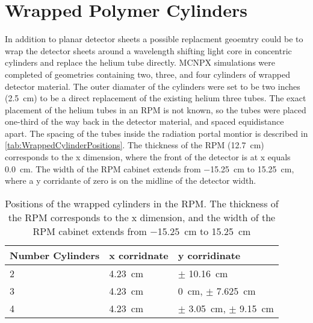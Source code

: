 \section{Wrapped Polymer Cylinders}
\label{sec:WrappedCylinders}

In addition to planar detector sheets a possible replacment geoemtry could be to wrap the detector sheets around a wavelength shifting light core in concentric cylinders and replace the helium tube directly.
MCNPX simulations were completed of geometries containing two, three, and four cylinders of wrapped detector material.
The outer diamater of the cylinders were set to be two inches (\SI{2.5}{\cm}) to be a direct replacement of the existing helium three tubes.
The exact placement of the helium tubes in an RPM is not known, so the tubes were placed one-third of the way back in the detector material, and spaced equidistance apart.
The spacing of the tubes inside the radiation portal montior is described in \autoref{tab:WrappedCylinderPositions}.
The thickness of the RPM (\SI{12.7}{\cm}) corresponds to the x dimension, where the front of the detector is at x equals \SI{0.0}{\cm}.
The width of the RPM cabinet extends from \SI{-15.25}{\cm} to \SI{15.25}{\cm}, where a y corridante of zero is on the midline of the detector width.
\begin{table}
  \caption[Wrappend Cylinder Positions]{Positions of the wrapped cylinders in the RPM. The thickness of the RPM corresponds to the x dimension, and the width of the RPM cabinet extends from \SI{-15.25}{\cm} to \SI{15.25}{\cm}}
  \label{tab:WrappedCylinderPositions}
  \begin{tabular}{m{2cm} | m{3cm} m{4cm} }
    \toprule
    Number Cylinders & x corridnate & y corridinate \\
    \midrule
    2 & \SI{4.23}{\cm} & $\pm$ \SI{10.16}{\cm} \\
    3 & \SI{4.23}{\cm} & \SI{0}{\cm}, $\pm$ \SI{7.625}{\cm} \\
    4 & \SI{4.23}{\cm} & $\pm$ \SI{3.05}{\cm}, $\pm$ \SI{9.15}{\cm} \\
    \bottomrule
  \end{tabular}
\end{table}
